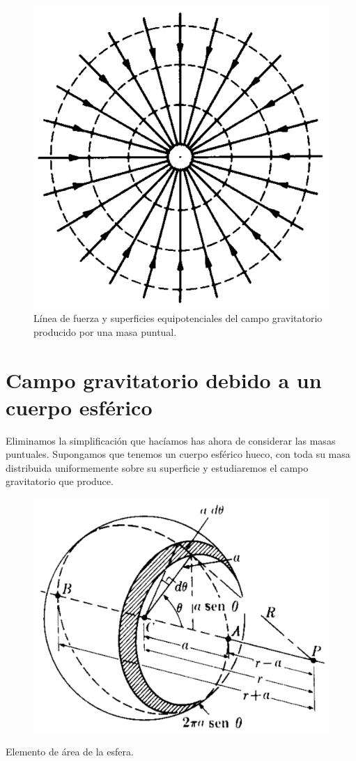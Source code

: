 \begin{figure}[H]
	\centering
	\includegraphics[width=.5\textwidth]{imagenes/imagenes14/T14IM09.png}
	\caption*{Línea de fuerza y superficies equipotenciales del campo gravitatorio producido por una masa puntual.}
\end{figure}

\section{Campo gravitatorio debido a un cuerpo esférico}

Eliminamos la simplificación que hacíamos has ahora de considerar las masas puntuales. Supongamos que tenemos un cuerpo esférico hueco, con toda su masa distribuida uniformemente sobre su superficie y estudiaremos el campo gravitatorio que produce.

\begin{figure}[H]
	\centering
	\includegraphics[width=.75\textwidth]{imagenes/imagenes14/T14IM10.png}
\end{figure}

Elemento de área de la esfera.

